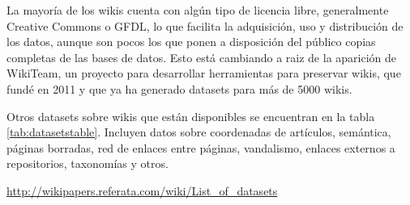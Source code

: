 \documentclass[11pt,onecolumn]{article}
\begin{document}
La mayoría de los wikis cuenta con algún tipo de licencia libre, generalmente Creative Commons o GFDL, lo que facilita la adquisición, uso y distribución de los datos, aunque son pocos los que ponen a disposición del público copias completas de las bases de datos. Esto está cambiando a raiz de la aparición de WikiTeam, un proyecto para desarrollar herramientas para preservar wikis, que fundé en 2011 y que ya ha generado datasets para más de 5000 wikis.

Otros datasets sobre wikis que están disponibles se encuentran en la tabla \ref{tab:datasetstable}. Incluyen datos sobre coordenadas de artículos, semántica, páginas borradas, red de enlaces entre páginas, vandalismo, enlaces externos a repositorios, taxonomías y otros.

\href{http://wikipapers.referata.com/wiki/List_of_datasets}{http://wikipapers.referata.com/wiki/List\_of\_datasets}
\end{document}
